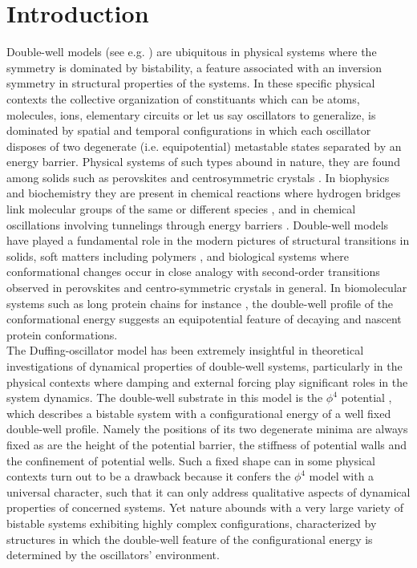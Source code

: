 \documentclass[%
 aip,
cha,
 amsmath,amssymb,
preprint,
]{revtex4-2}
\begin{document}
\section{\label{sec1} Introduction}
Double-well models (see e.g. \cite{a1,a2,a3,a4,a5,a51,a6}) are ubiquitous in physical systems where the symmetry is dominated by bistability, a feature associated with an inversion symmetry in structural properties of the systems. In these specific physical contexts the collective organization of constituants which can be atoms, molecules, ions, elementary circuits or let us say oscillators to generalize, is dominated by spatial and temporal configurations in which each oscillator disposes of two degenerate (i.e. equipotential) metastable states separated by an energy barrier. Physical systems of such types abound in nature, they are found among solids such as perovskites and centrosymmetric crystals \cite{a1,a3}. In biophysics and biochemistry they are present in chemical reactions where hydrogen bridges link molecular groups of the same or different species \cite{a5,a6,a7,a8,a81}, and in chemical oscillations involving tunnelings through energy barriers \cite{a9,a10}. Double-well models have played a fundamental role in the modern pictures of structural transitions in solids, soft matters including polymers \cite{a9,a10,a12,a13,a14}, and biological systems where conformational changes occur in close analogy with second-order transitions observed in perovskites and centro-symmetric crystals in general. In biomolecular systems such as long protein chains for instance \cite{a9,a10}, the double-well profile of the conformational energy suggests an equipotential feature of decaying and nascent protein conformations.\\
The Duffing-oscillator model \cite{a15} has been extremely insightful in theoretical investigations of dynamical properties of double-well systems, particularly in the physical contexts where damping and external forcing play significant roles in the system dynamics. The double-well substrate in this model is the $\phi^4$ potential \cite{a1,a2,a3}, which describes a bistable system with a configurational energy of a well fixed double-well profile. Namely the positions of its two degenerate minima are always fixed as are the height of the potential barrier, the stiffness of potential walls and the confinement of potential wells. Such a fixed shape can in some physical contexts turn out to be a drawback because it confers the $\phi^4$ model with a universal character, such that it can only address qualitative aspects of dynamical properties of concerned systems. Yet nature abounds with a very large variety of bistable systems exhibiting highly complex configurations, characterized by structures in which the double-well feature of the configurational energy is determined by the oscillators' environment. \\
\end{document}
